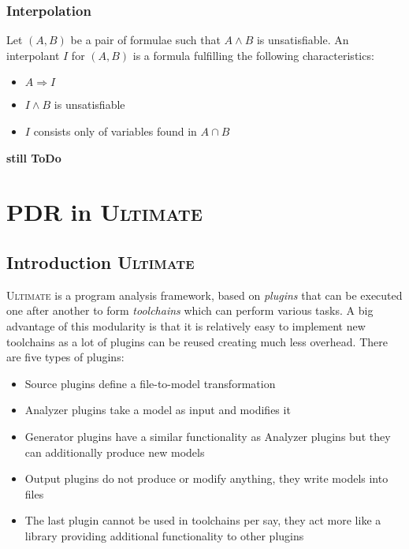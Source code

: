 \documentclass[11pt, a4paper, BCOR=10mm, ngerman]{scrbook}
\begin{document}
\subsection{Interpolation}
Let $(A, B)$ be a pair of formulae such that $A \land B$ is unsatisfiable. An interpolant $I$ for $(A, B)$ is a formula fulfilling the following characteristics:
\begin{itemize}
\item $A \Rightarrow I$
\item $I \land B$ is unsatisfiable
\item $I$ consists only of variables found in $A \cap B$
\end{itemize}

\textbf{still ToDo}

\pagebreak


\chapter{PDR in \textsc{Ultimate}}
\section{Introduction \textsc{Ultimate}}
\textsc{Ultimate} is a program analysis framework, based on \textsl{plugins} that can be executed one after another to form \textsl{toolchains} which can perform various tasks. A big advantage of this modularity is that it is relatively easy to implement new toolchains as a lot of plugins can be reused creating much less overhead. There are five types of plugins: 
\begin{itemize}
\item Source plugins define a file-to-model transformation

\item  Analyzer plugins take a model as input and modifies it

\item Generator plugins have a similar functionality as Analyzer plugins but they can additionally produce new models

\item Output plugins do not produce or modify anything, they write models into files

\item The last plugin cannot be used in toolchains per say, they act more like a library providing additional functionality to other plugins

\end{itemize}
\end{document}

